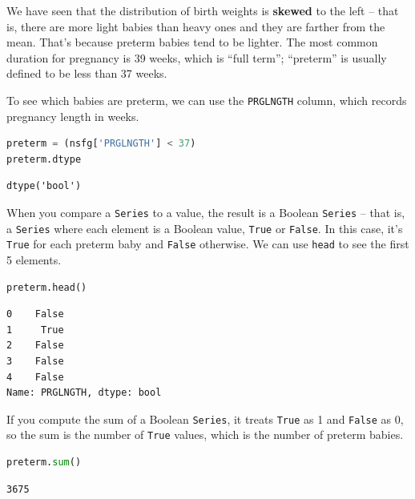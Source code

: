 We have seen that the distribution of birth weights is \textbf{skewed}
to the left -- that is, there are more light babies than heavy ones and
they are farther from the mean. That's because preterm babies tend to be
lighter. The most common duration for pregnancy is 39 weeks, which is
``full term''; ``preterm'' is usually defined to be less than 37 weeks.

To see which babies are preterm, we can use the
\passthrough{\lstinline!PRGLNGTH!} column, which records pregnancy
length in weeks.

\begin{lstlisting}[language=Python,style=source]
preterm = (nsfg['PRGLNGTH'] < 37)
preterm.dtype
\end{lstlisting}

\begin{lstlisting}[style=output]
dtype('bool')
\end{lstlisting}

When you compare a \passthrough{\lstinline!Series!} to a value, the
result is a Boolean \passthrough{\lstinline!Series!} -- that is, a
\passthrough{\lstinline!Series!} where each element is a Boolean value,
\passthrough{\lstinline!True!} or \passthrough{\lstinline!False!}. In
this case, it's \passthrough{\lstinline!True!} for each preterm baby and
\passthrough{\lstinline!False!} otherwise. We can use
\passthrough{\lstinline!head!} to see the first 5 elements.

\begin{lstlisting}[language=Python,style=source]
preterm.head()
\end{lstlisting}

\begin{lstlisting}[style=output]
0    False
1     True
2    False
3    False
4    False
Name: PRGLNGTH, dtype: bool
\end{lstlisting}

If you compute the sum of a Boolean \passthrough{\lstinline!Series!}, it
treats \passthrough{\lstinline!True!} as 1 and
\passthrough{\lstinline!False!} as 0, so the sum is the number of
\passthrough{\lstinline!True!} values, which is the number of preterm
babies.

\begin{lstlisting}[language=Python,style=source]
preterm.sum()
\end{lstlisting}

\begin{lstlisting}[style=output]
3675
\end{lstlisting}

